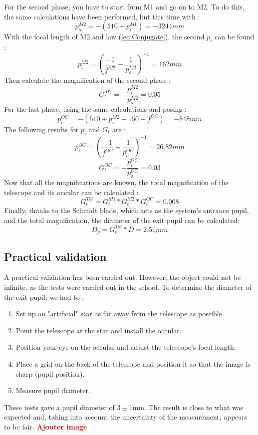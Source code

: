For the second phase, you have to start from M1 and go on to M2. To do this, the same calculations have been performed, but this time with :
\begin{equation}
    p_o^{M2} = -(510 + p_i^{M1}) = -3244mm
\end{equation}
With the focal length of M2 and law (\ref{eq:Conjugate}), the second $p_i$ can be found :
\begin{equation}
    p_i^{M2} = \left(\frac{-1}{f^{M2}}-\frac{1}{p_o^{M2}}\right)^{-1} = 162 mm
\end{equation}
Then calculate the magnification of the second phase :
\begin{equation}
    G_t^{M2} = -\frac{p_i^{M2}}{p_o^{M2}} = 0.05
\end{equation}
For the last phase, using the same calculations and posing :
\begin{equation}
    p_o^{OC} = -(510 + p_i^{M2} + 150 + f^{OC}) = -848mm
\end{equation}
The following results for $p_i$ and $G_t$ are :
\begin{equation}
    p_i^{OC} = \left(\frac{-1}{f^{OC}}+\frac{1}{p_o^{OC}}\right)^{-1} = 26.82 mm
\end{equation}
\begin{equation}
    G_t^{OC} = -\frac{p_i^{OC}}{p_o^{OC}} = 0.03
\end{equation}
Now that all the magnifications are known, the total magnification of the telescope and its occular can be calculated :
\begin{equation}
    G_t^{Tot} = G_t^{M1}*G_t^{M2}*G_t^{OC} = \underline{0.008}
\end{equation}
Finally, thanks to the Schmidt blade, which acts as the system's entrance pupil, and the total magnification,
the diameter of the exit pupil can be calculated:
\begin{equation}
    D_p = G_t^{Tot} * D = \underline{2.51mm}
\end{equation}
\subsection{Practical validation}
A practical validation has been carried out. However, the object could not be infinite, as the tests were carried out in the school.
To determine the diameter of the exit pupil, we had to :
\begin{enumerate}
    \item Set up an "artificial" star as far away from the telescope as possible.
    \item Point the telescope at the star and install the occular.
    \item Position your eye on the occular and adjust the telescope's focal length.
    \item Place a grid on the back of the telescope and position it so that the image is sharp (pupil position).
    \item Measure pupil diameter.
\end{enumerate}
These tests gave a pupil diameter of $3 \pm 1$mm. The result is close to what was expected and, taking into account
the uncertainty of the measurement, appears to be fair.
\newline
\textbf{\textcolor{red}{Ajouter image}}
